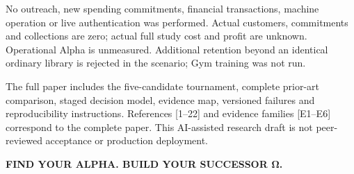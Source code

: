 \documentclass[10pt,letterpaper]{article}
\begin{document}
No outreach, new spending commitments, financial transactions, machine operation or live authentication was performed. Actual customers, commitments and collections are zero; actual full study cost and profit are unknown. Operational Alpha is unmeasured. Additional retention beyond an identical ordinary library is rejected in the scenario; Gym training was not run.

The full paper includes the five-candidate tournament, complete prior-art comparison, staged decision model, evidence map, versioned failures and reproducibility instructions. References {[}1--22{]} and evidence families {[}E1--E6{]} correspond to the complete paper. This AI-assisted research draft is not peer-reviewed acceptance or production deployment.

\textbf{FIND YOUR ALPHA. BUILD YOUR SUCCESSOR Ω.}
\end{document}
